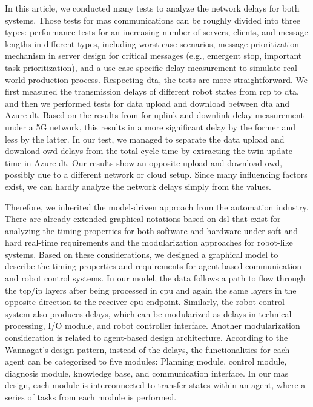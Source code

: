In this article, we conducted many tests to analyze the network delays 
for both systems. Those tests for \gls{mas} communications can be roughly 
divided into three types: performance tests for an increasing number of servers, 
clients, and message lengths in different types, including worst-case scenarios, 
message prioritization mechanism in server design for critical messages 
(e.g., emergent stop, important task prioritization), and a use case specific 
delay measurement to simulate real-world production process. Respecting \gls{dta}, 
the tests are more straightforward. We first measured the transmission delays of 
different robot states from \gls{rcp} to \gls{dta}, and then we performed tests 
for data upload and download between \gls{dta} and Azure \gls{dt}. Based on the 
results from \cite{cainelli_performance_2023} for uplink and downlink delay measurement under a 5G 
network, this results in a more significant delay by the former and less by the 
latter. In our test, we managed to separate the data upload and download \gls{owd} 
delays from the total cycle time by extracting the twin update time in 
Azure \gls{dt}. Our results show an opposite upload and download \gls{owd}, 
possibly due to a different network or cloud setup. Since many influencing 
factors exist, we can hardly analyze the network delays simply from the values. 



Therefore, we inherited the model-driven approach from the automation industry. 
There are already extended graphical notations based on \gls{dsl} that exist 
for analyzing the timing properties for both software and hardware under soft 
and hard real-time requirements\cite{hujo_toward_2022} and the modularization 
approaches for robot-like systems\cite{volpert_supporting_nodate}. Based on these 
considerations, we designed a graphical model to describe the timing properties 
and requirements for agent-based communication and robot control systems. 
In our model, the data follows a path to flow through the \gls{tcp/ip} layers 
after being processed in \gls{cpu} and again the same layers in the opposite 
direction to the receiver \gls{cpu} endpoint. Similarly, the robot control system 
also produces delays, which can be modularized as delays in technical processing, 
I/O module, and robot controller interface. 
Another modularization consideration is related to agent-based design architecture. 
According to the Wannagat's design pattern\cite{wannagat_agent_nodate}\cite{wannagat_entwicklung_2010}, instead of the delays, the 
functionalities for each agent can be categorized to five modules:  Planning 
module, control module, diagnosis module, knowledge base, and communication 
interface. In our \gls{mas} design, each module is interconnected to transfer 
states within an agent, where a series of tasks from each module is performed.


